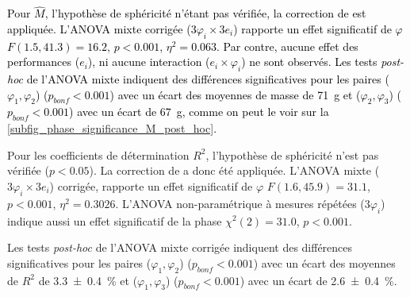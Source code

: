 \textcolor{black}{Pour $\hat{M}$, %
l'hypothèse de sphéricité \parencite{mauchly_significance_1940} n'étant pas vérifiée, la correction de \textcite{huynh_estimation_1976} est appliquée. L'ANOVA mixte corrigée ($3 \varphi_i \times 3 e_i$) rapporte un effet significatif de $\varphi$ $F(1.5, 41.3) = 16.2$, $p<0.001$,  $\eta^2 = 0.063$. Par contre, aucune effet des performances ($e_i$), ni aucune interaction ($e_i\times\varphi_i$) ne sont observés. %
%
Les tests \textit{post-hoc} de l'ANOVA mixte indiquent des différences significatives pour les paires ($\varphi_1,\varphi_2$) ($p_{bonf}<0.001$) avec un écart des moyennes de masse de \SI{71}{\gram} et ($\varphi_2,\varphi_3$) ($p_{bonf}<0.001$) avec un écart de \SI{67}{\gram}, comme on peut le voir sur la \cref{subfig_phase_significance_M_post_hoc}.}

\tikzexternaldisable

\tikzexternalenable

Pour les coefficients de détermination $R^2$, l'hypothèse de sphéricité \parencite{mauchly_significance_1940} n'est pas vérifiée ($p<0.05$). La correction de \textcite{huynh_estimation_1976} a donc été appliquée. L'ANOVA mixte ($3 \varphi_i \times 3 e_i$) corrigée, rapporte un effet significatif de $\varphi$ $F(1.6, 45.9) = 31.1$, $p<0.001$,  $\eta^2 = 0.3026$. L'ANOVA non-paramétrique à mesures répétées \parencite{kruskal_use_1952} ($3 \varphi_i$) indique aussi un effet significatif de la phase $\chi^2(2)=31.0$, $p<0.001$.

Les tests \textit{post-hoc} de l'ANOVA mixte corrigée indiquent des différences significatives pour les paires ($\varphi_1,\varphi_2$) ($p_{bonf}<0.001$) avec un écart des moyennes de $R^2$ de \SI{3.3\pm0.4}{\percent} et ($\varphi_1,\varphi_3$) ($p_{bonf}<0.001$) avec un écart de \SI{2.6\pm0.4}{\percent}. 

